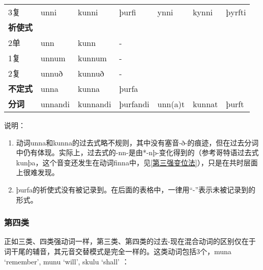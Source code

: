 \begin{longtable}{llll|lll}
    3复             & unni                     & kunni                    & þurfi                & ynni                 & kynni  & þyrfti  \\
    \textbf{祈使式} & ~                        & ~                        & \multicolumn{1}{c}{} & ~                    & ~      & ~       \\
    2单             & unn                      & kunn                     & -                    & ~                    & ~      & ~       \\
    1复             & unnum                    & kunnum                   & -                    & ~                    & ~      & ~       \\
    2复             & unnuð                    & kunnuð                   & -                    & ~                    & ~      & ~       \\
    \textbf{不定式} & unna                     & kunna                    & þurfa                & \multicolumn{1}{c}{} & ~      & ~       \\
    \textbf{分词}   & unnandi                  & kunnandi                 & þurfandi             & unn(a)t              & kunnat &
    þurft                                                                                                                                  \\
\end{longtable}


说明：


\begin{enumerate}

    \item
          动词unna和kunna的过去式略不规则，其中没有塞音-ð-的痕迹，但在过去分词中仍有体现。实际上，过去式的-nn-是由*-nþ-变化得到的（参考哥特语过去式kunþa，这个音变还发生在动词finna中，见\ref{第三强变位法}），只是在共时层面上很难发现。
    \item
          þurfa的祈使式没有被记录到。在后面的表格中，一律用``-''表示未被记录到的形式。
\end{enumerate}

\subsubsection{第四类}

正如三类、四类强动词一样，第三类、第四类的过去-现在混合动词的区别仅在于词干尾的辅音，其元音交替模式是完全一样的。这类动词包括3个，muna
`remember‌', munu `will‌', skulu `shall‌' ：

